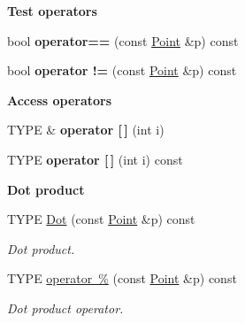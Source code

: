 \begin{Indent}\textbf{ Test operators}\par
\begin{DoxyCompactItemize}
\item 
\mbox{\label{classcy_1_1_point_aa980048e2a3d800ad7a193842d1a5855}} 
bool {\bfseries operator==} (const \mbox{\hyperlink{classcy_1_1_point}{Point}} \&p) const
\item 
\mbox{\label{classcy_1_1_point_af3c2d35d8ee142673694f7e9e00a9eda}} 
bool {\bfseries operator !=} (const \mbox{\hyperlink{classcy_1_1_point}{Point}} \&p) const
\end{DoxyCompactItemize}
\end{Indent}
\begin{Indent}\textbf{ Access operators}\par
\begin{DoxyCompactItemize}
\item 
\mbox{\label{classcy_1_1_point_abd29004d95c2ee8d7f4d8b0faee32550}} 
T\+Y\+PE \& {\bfseries operator \mbox{[}$\,$\mbox{]}} (int i)
\item 
\mbox{\label{classcy_1_1_point_ae1b84c246149102b5e6900880012fd5c}} 
T\+Y\+PE {\bfseries operator \mbox{[}$\,$\mbox{]}} (int i) const
\end{DoxyCompactItemize}
\end{Indent}
\begin{Indent}\textbf{ Dot product}\par
\begin{DoxyCompactItemize}
\item 
\mbox{\label{classcy_1_1_point_a2dcd8d8570a2baf15c151f39b81aeadd}} 
T\+Y\+PE \mbox{\hyperlink{classcy_1_1_point_a2dcd8d8570a2baf15c151f39b81aeadd}{Dot}} (const \mbox{\hyperlink{classcy_1_1_point}{Point}} \&p) const
\begin{DoxyCompactList}\small\item\em Dot product. \end{DoxyCompactList}\item 
\mbox{\label{classcy_1_1_point_a78e5fde0ddbbc3bd107e427b900cb0d4}} 
T\+Y\+PE \mbox{\hyperlink{classcy_1_1_point_a78e5fde0ddbbc3bd107e427b900cb0d4}{operator \%}} (const \mbox{\hyperlink{classcy_1_1_point}{Point}} \&p) const
\begin{DoxyCompactList}\small\item\em Dot product operator. \end{DoxyCompactList}\end{DoxyCompactItemize}
\end{Indent}
